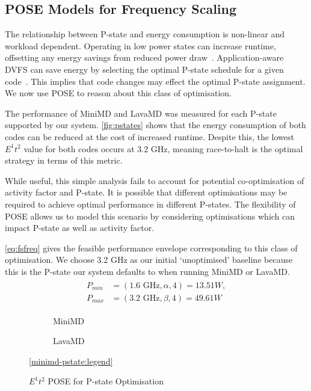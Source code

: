 \subsection{POSE Models for Frequency Scaling}
\noindent
The relationship between P-state and energy consumption is non-linear and workload dependent.
Operating in low power states can increase runtime, offsetting any energy savings from reduced power draw~\cite{le:2010aa}.
Application-aware DVFS can save energy by selecting the optimal P-state schedule for a given code~\cite{choi:2004aa}.
This implies that code changes may effect the optimal P-state assignment. 
We now use POSE to reason about this class of optimisation.

The performance of MiniMD and LavaMD was measured for each P-state supported by our system.
\autoref{fig:pstates} shows that the energy consumption of both codes can be reduced at the cost of increased runtime.
Despite this, the lowest $E^1t^2$ value for both codes occurs at 3.2 GHz, meaning race-to-halt is the optimal strategy in terms of this metric. 

While useful, this simple analysis fails to account for potential co-opti\-misa\-tion of activity factor and P-state.
It is possible that different optimisations may be required to achieve optimal performance in different P-states.
The flexibility of POSE allows us to model this scenario by considering optimisations which can impact P-state as well as activity factor.

\autoref{eq:fsfreq} gives the feasible performance envelope corresponding to this class of optimisation.
We choose 3.2 GHz as our initial `unoptimised' baseline because this is the P-state our system defaults to when running MiniMD or LavaMD.
\begin{align}
  \label{eq:fsfreq}
  \begin{split}
    P_{min} &= (1.6\text{ GHz}, \alpha, 4) = 13.51W, \\
    P_{max} &= (3.2\text{ GHz}, \beta, 4) = 49.61W
  \end{split}
\end{align}

\begin{figure*}[t]%
  \scriptsize
\begin{subfigure}[t]{.5\linewidth}%
%
\caption{MiniMD}%
\label{fig:minimd-pstates}%
\end{subfigure}%
\begin{subfigure}[t]{.5\linewidth}%
%
\caption{LavaMD}%
\label{fig:lavamd-pstates}%
\end{subfigure}%
\begin{center}%
\ref{minimd-pstate:legend}%
\end{center}%
\caption{$E^1t^2$ POSE for P-state Optimisation}%
\label{fig:pstates}%
\end{figure*}%

